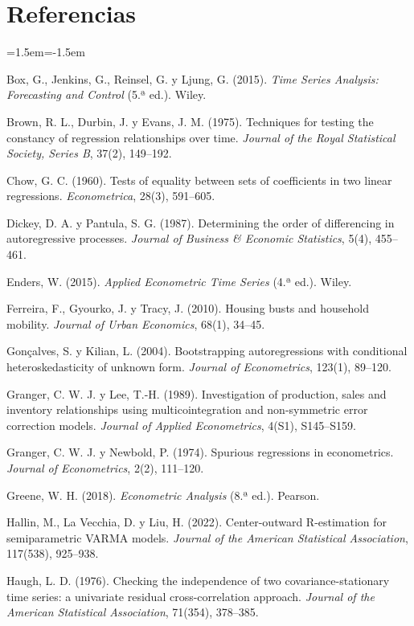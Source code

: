 \documentclass[11pt,a4paper]{article}
\begin{document}
\section*{Referencias}
\begin{list}{}{\leftmargin=1.5em\itemindent=-1.5em\itemsep=3pt}
\item Box, G., Jenkins, G., Reinsel, G. y Ljung, G. (2015). \emph{Time Series Analysis: Forecasting and Control} (5.ª ed.). Wiley.
\item Brown, R. L., Durbin, J. y Evans, J. M. (1975). Techniques for testing the constancy of regression relationships over time. \emph{Journal of the Royal Statistical Society, Series B}, 37(2), 149--192.
\item Chow, G. C. (1960). Tests of equality between sets of coefficients in two linear regressions. \emph{Econometrica}, 28(3), 591--605.
\item Dickey, D. A. y Pantula, S. G. (1987). Determining the order of differencing in autoregressive processes. \emph{Journal of Business \& Economic Statistics}, 5(4), 455--461.
\item Enders, W. (2015). \emph{Applied Econometric Time Series} (4.ª ed.). Wiley.
\item Ferreira, F., Gyourko, J. y Tracy, J. (2010). Housing busts and household mobility. \emph{Journal of Urban Economics}, 68(1), 34--45.
\item Gonçalves, S. y Kilian, L. (2004). Bootstrapping autoregressions with conditional heteroskedasticity of unknown form. \emph{Journal of Econometrics}, 123(1), 89--120.
\item Granger, C. W. J. y Lee, T.-H. (1989). Investigation of production, sales and inventory relationships using multicointegration and non-symmetric error correction models. \emph{Journal of Applied Econometrics}, 4(S1), S145--S159.
\item Granger, C. W. J. y Newbold, P. (1974). Spurious regressions in econometrics. \emph{Journal of Econometrics}, 2(2), 111--120.
\item Greene, W. H. (2018). \emph{Econometric Analysis} (8.ª ed.). Pearson.
\item Hallin, M., La Vecchia, D. y Liu, H. (2022). Center-outward R-estimation for semiparametric VARMA models. \emph{Journal of the American Statistical Association}, 117(538), 925--938.
\item Haugh, L. D. (1976). Checking the independence of two covariance-stationary time series: a univariate residual cross-correlation approach. \emph{Journal of the American Statistical Association}, 71(354), 378--385.

\end{list}
\end{document}
